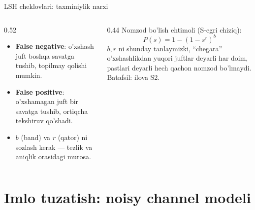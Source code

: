 \documentclass[aspectratio=169,11pt]{beamer}
\begin{document}
\begin{frame}{LSH cheklovlari: taxminiylik narxi}
  \begin{columns}[T]
    \begin{column}{0.52\textwidth}
      \begin{tcolorbox}[warnbox,title=Asosiy cheklovlar]
        \small
        \begin{itemize}\setlength\itemsep{2pt}
          \item \textbf{False negative}: o'xshash juft boshqa savatga
                tushib, topilmay qolishi mumkin.
          \item \textbf{False positive}: o'xshamagan juft bir savatga
                tushib, ortiqcha tekshiruv qo'shadi.
          \item $b$ (band) va $r$ (qator) ni sozlash kerak ---
                tezlik va aniqlik orasidagi murosa.
        \end{itemize}
      \end{tcolorbox}
    \end{column}
    \begin{column}{0.44\textwidth}
      \footnotesize
      Nomzod bo'lish ehtimoli (S-egri chiziq):
      $$ P(s) = 1 - (1 - s^{r})^{b} $$
      \footnotesize
      $b,r$ ni shunday tanlaymizki, ``chegara'' o'xshashlikdan yuqori
      juftlar deyarli har doim, pastlari deyarli hech qachon nomzod
      bo'lmaydi.\\[3pt]
      {\color{halfgray}Batafsil: ilova S2.}
    \end{column}
  \end{columns}
\end{frame}

\section[Noisy channel]{Imlo tuzatish: noisy channel modeli}
\end{document}
